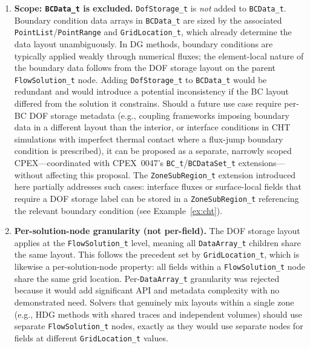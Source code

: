\documentclass[11pt,letterpaper]{article}
\begin{document}
\begin{enumerate}[leftmargin=2em]

\item \label{dd:bcdata} \textbf{Scope: \texttt{BCData\_t} is excluded.}
  \texttt{DofStorage\_t} is \emph{not} added to
  \texttt{BCData\_t}.  Boundary condition data arrays in
  \texttt{BCData\_t} are sized by the associated
  \texttt{PointList}/\texttt{PointRange} and \texttt{GridLocation\_t},
  which already determine the data layout unambiguously.  In DG
  methods, boundary conditions are typically applied weakly through
  numerical fluxes; the element-local nature of the boundary data
  follows from the DOF storage layout on the parent
  \texttt{FlowSolution\_t} node.  Adding
  \texttt{DofStorage\_t} to \texttt{BCData\_t} would be
  redundant and would introduce a potential inconsistency if the BC
  layout differed from the solution it constrains.  Should a
  future use case require per-BC DOF storage metadata (e.g.,
  coupling frameworks imposing boundary data in a different
  layout than the interior, or interface conditions in CHT
  simulations with imperfect thermal contact where a flux-jump
  boundary condition is prescribed), it can be proposed as a
  separate, narrowly scoped CPEX---coordinated with CPEX~0047's
  \texttt{BC\_t}/\texttt{BCDataSet\_t} extensions---without affecting
  this proposal.
  The \texttt{ZoneSubRegion\_t} extension introduced here
  partially addresses such cases: interface fluxes or
  surface-local fields that require a DOF storage label
  can be stored in a \texttt{ZoneSubRegion\_t} referencing the
  relevant boundary condition (see Example~\ref{ex:cht}).

\item \textbf{Per-solution-node granularity (not per-field).}
  The DOF storage layout applies at the \texttt{FlowSolution\_t} level,
  meaning all \texttt{DataArray\_t} children share the same
  layout.  This follows the precedent set by
  \texttt{GridLocation\_t}, which is likewise a per-solution-node
  property: all fields within a \texttt{FlowSolution\_t} node share
  the same grid location.  Per-\texttt{DataArray\_t} granularity was
  rejected because it would add significant API and metadata
  complexity with no demonstrated need.  Solvers that genuinely mix
  layouts within a single zone (e.g., HDG methods with
  shared traces and independent volumes) should use separate
  \texttt{FlowSolution\_t} nodes, exactly as they would use separate
  nodes for fields at different \texttt{GridLocation\_t} values.


\end{enumerate}
\end{document}
